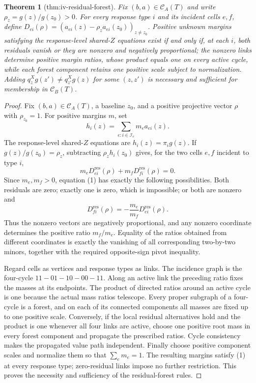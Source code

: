 \documentclass{article}
\newtheorem{theorem}{Theorem}
\begin{document}
\begin{theorem}[thm:iv-residual-forest]\label{thm:iv-residual-forest}
Fix \((b,a)\in\mathcal C_A(T)\) and write \(\rho_z=g(z)/g(z_0)>0\). For every response type \(i\) and its incident cells \(e,f\), define \(D_{ei}(\rho)=(a_{ei}(z)-\rho_z a_{ei}(z_0))_{z\ne z_0}\). Positive unknown margins satisfying the response-level shared-\(Z\) equations exist if and only if, at each \(i\), both residuals vanish or they are nonzero and negatively proportional; the nonzero links determine positive margin ratios, whose product equals one on every active cycle, while each forest component retains one positive scale subject to normalization. Adding \(q^X_zg(z')\ne q^X_{z'}g(z)\) for some \((z,z')\) is necessary and sufficient for membership in \(\mathcal C_B(T)\).
\end{theorem}
\begin{proof}
Fix \((b,a)\in\mathcal C_A(T)\), a baseline \(z_0\), and a positive projective vector \(\rho\) with \(\rho_{z_0}=1\).  For positive margins \(m\), set
\[
h_i(z)=\sum_{e:i\in\mathcal I_e}m_ea_{ei}(z).
\]
The response-level shared-\(Z\) equations are \(h_i(z)=\pi_i g(z)\).  If \(g(z)/g(z_0)=\rho_z\), subtracting \(\rho_z h_i(z_0)\) gives, for the two cells \(e,f\) incident to type \(i\),
\[
m_eD^{\mathrm{res}}_{ei}(\rho)+m_fD^{\mathrm{res}}_{fi}(\rho)=0. \tag{1}
\]
Since \(m_e,m_f>0\), equation (1) has exactly the following possibilities.  Both residuals are zero; exactly one is zero, which is impossible; or both are nonzero and
\[
D^{\mathrm{res}}_{fi}(\rho)
=-\frac{m_e}{m_f}D^{\mathrm{res}}_{ei}(\rho).
\]
Thus the nonzero vectors are negatively proportional, and any nonzero coordinate determines the positive ratio \(m_f/m_e\).  Equality of the ratios obtained from different coordinates is exactly the vanishing of all corresponding two-by-two minors, together with the required opposite-sign pivot inequality.

Regard cells as vertices and response types as links.  The incidence graph is the four-cycle \(11-01-10-00-11\).  Along an active link the preceding ratio fixes the masses at its endpoints.  The product of directed ratios around an active cycle is one because the actual mass ratios telescope.  Every proper subgraph of a four-cycle is a forest, and on each of its connected components all masses are fixed up to one positive scale.  Conversely, if the local residual alternatives hold and the product is one whenever all four links are active, choose one positive root mass in every forest component and propagate the prescribed ratios.  Cycle consistency makes the propagated value path independent.  Finally choose positive component scales and normalize them so that \(\sum_em_e=1\).  The resulting margins satisfy (1) at every response type; zero-residual links impose no further restriction.  This proves the necessity and sufficiency of the residual-forest rules.


\end{proof}
\end{document}
